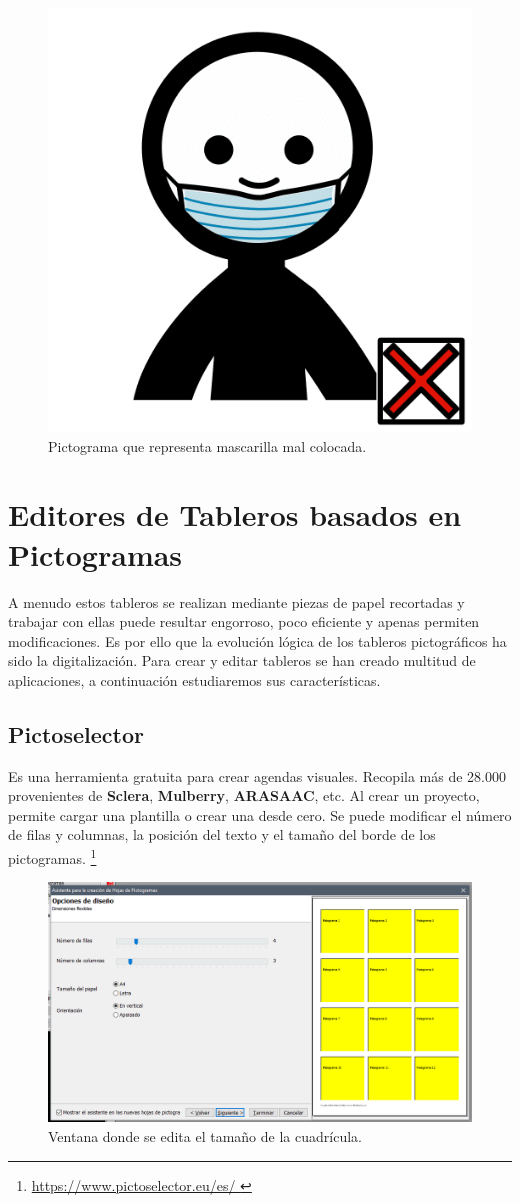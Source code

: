 \begin{figure}[h!]
	\centering
	\includegraphics[width=0.2\linewidth]{Imagenes/Bitmap/Mascarilla mal colocada}
	\caption{Pictograma que representa mascarilla mal colocada.}
	\label{fig:picto-mascarilla-mal-colocada}
\end{figure}

\section{Editores de Tableros basados en Pictogramas}

A menudo estos tableros se realizan mediante piezas de papel recortadas y trabajar con ellas puede resultar engorroso, poco eficiente y apenas permiten modificaciones. Es por ello que la evolución lógica de los tableros pictográficos ha sido la digitalización. Para crear y editar tableros se han creado multitud de aplicaciones, a continuación estudiaremos sus características.

\subsection{Pictoselector}
Es una herramienta gratuita para crear agendas visuales. Recopila más de 28.000 provenientes de \textbf{Sclera}, \textbf{Mulberry}, \textbf{ARASAAC}, etc. Al crear un proyecto, permite cargar una plantilla o crear una desde cero. Se puede modificar el número de filas y columnas, la posición del texto y el tamaño del borde de los pictogramas.
\footnote{\url{ https://www.pictoselector.eu/es/ }}

\begin{figure}[h!]
	\centering
	\includegraphics[width=0.7\linewidth]{Imagenes/Bitmap/Pictoselector Tablero}
	\caption{Ventana donde se edita el tamaño de la cuadrícula.}
	\label{fig:pictoselector-tablero}
\end{figure}


